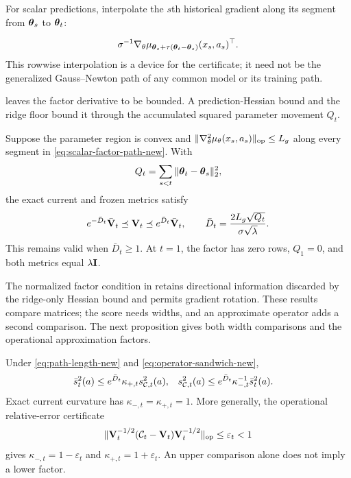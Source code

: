 For scalar predictions, interpolate the $s$th historical gradient along its
segment from $\boldsymbol{\theta}_s$ to $\boldsymbol{\theta}_t$:

\begin{equation}\label{eq:scalar-factor-path-new}
 \sigma^{-1}\nabla_\theta\mu_{\boldsymbol{\theta}_s+
 \tau(\boldsymbol{\theta}_t-\boldsymbol{\theta}_s)}(x_s,a_s)^\top.
\end{equation}
This rowwise interpolation is a device for the certificate; it need not be the
generalized Gauss--Newton path of any common model or its training path.

 leaves the factor derivative to be bounded. A
prediction-Hessian bound and the ridge floor bound it through the accumulated
squared parameter movement $Q_t$.

\begin{corollary}
\label{cor:hessian-path-new}
Suppose the parameter region is convex and
$\|\nabla_\theta^2\mu_\theta(x_s,a_s)\|_{\rm op}\le L_g$ along every segment
in \eqref{eq:scalar-factor-path-new}.  With
\begin{equation}\label{eq:Qt-new}
 Q_t=\sum_{s<t}\|\boldsymbol{\theta}_t-\boldsymbol{\theta}_s\|_2^2,
\end{equation}
the exact current and frozen metrics satisfy
\begin{equation}\label{eq:hessian-path-sandwich-new}
 e^{-\bar D_t}\bar{\mathbf{V}}_t\preceq\mathbf{V}_t\preceq e^{\bar D_t}\bar{\mathbf{V}}_t,
 \qquad
 \bar D_t=\frac{2L_g\sqrt{Q_t}}{\sigma\sqrt\lambda}.
\end{equation}
This remains valid when $\bar D_t\ge1$.  At $t=1$, the factor has zero rows,
$Q_1=0$, and both metrics equal $\lambda\mathbf{I}$.
\end{corollary}

The normalized factor condition in  retains
directional information discarded by the ridge-only Hessian bound and permits
gradient rotation. These results compare matrices; the score needs widths,
and an approximate operator adds a second comparison. The next proposition
gives both width comparisons and the operational approximation factors.

\begin{proposition}
\label{prop:width-transport-new}
Under \eqref{eq:path-length-new} and \eqref{eq:operator-sandwich-new},
\begin{align}
 \bar s_t^2(a)&\le e^{\bar D_t}\kappa_{+,t}s_{\mathcal{C},t}^2(a),
 &s_{\mathcal{C},t}^2(a)&\le
 e^{\bar D_t}\kappa_{-,t}^{-1}\bar s_t^2(a).
 \label{eq:two-way-width-new}
\end{align}
Exact current curvature has $\kappa_{-,t}=\kappa_{+,t}=1$.  More generally,
the operational relative-error certificate
\begin{equation}\label{eq:relative-operator-certificate-new}
 \|\mathbf{V}_t^{-1/2}(\mathcal{C}_t-\mathbf{V}_t)\mathbf{V}_t^{-1/2}\|_{\rm op}
 \le\varepsilon_t<1
\end{equation}
gives $\kappa_{-,t}=1-\varepsilon_t$ and
$\kappa_{+,t}=1+\varepsilon_t$.  An upper comparison alone does not imply a
lower factor.
\end{proposition}

